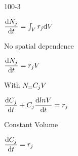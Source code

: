 \begin{mitframe}{100-3}
 \begin{listone}
	\item $\dfrac{\mathrm{d}\massspecflux{j}}{\mathrm{d}\timet}=\int_{\vol}\pos_j\mathrm{d}\vol$
    	\begin{listtwo}
        	\item No spatial dependence
            		\begin{listthree}
                    	\item $\dfrac{\mathrm{d}\massspecflux{j}}{\mathrm{d}\timet}=\pos_j\vol$
                        \item With $\massspecflux=\conc_j\vol$
                        \begin{listfour}
                        	\item $\dfrac{\mathrm{d}\conc_j}{\mathrm{d}\timet}+\conc_j\dfrac{\mathrm{d}ln\vol}{\mathrm{d}\timet}=\pos_j$
                            	\begin{listfive}
                                	\item Constant Volume
                                    	\begin{listsix}
                                        	\item $\dfrac{\mathrm{d}\conc_j}{\mathrm{d}\timet}=\pos_j$
                                        \end{listsix}
                                \end{listfive}
                        \end{listfour}
                    \end{listthree}
        \end{listtwo}
\end{listone}   
\end{mitframe}
